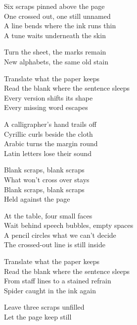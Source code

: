 \begin{lyrics}
Six scraps pinned above the page\\
One crossed out, one still unnamed\\
A line bends where the ink runs thin\\
A tune waits underneath the skin

Turn the sheet, the marks remain\\
New alphabets, the same old stain

Translate what the paper keeps\\
Read the blank where the sentence sleeps\\
Every version shifts its shape\\
Every missing word escapes

A calligrapher’s hand trails off\\
Cyrillic curls beside the cloth\\
Arabic turns the margin round\\
Latin letters lose their sound

Blank scraps, blank scraps\\
What won’t cross over stays\\
Blank scraps, blank scraps\\
Held against the page

At the table, four small faces\\
Wait behind speech bubbles, empty spaces\\
A pencil circles what we can’t decide\\
The crossed-out line is still inside

Translate what the paper keeps\\
Read the blank where the sentence sleeps\\
From staff lines to a stained refrain\\
Spider caught in the ink again

Leave three scraps unfilled\\
Let the page keep still
\end{lyrics}

